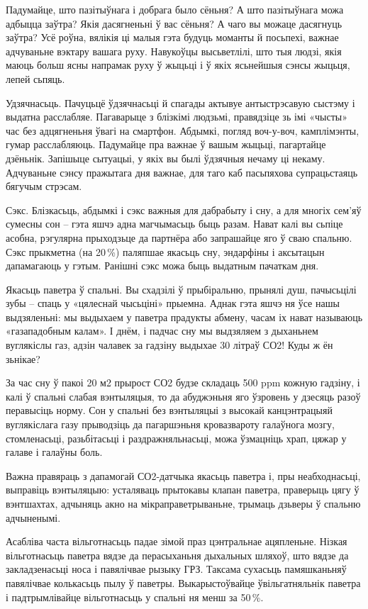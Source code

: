 Падумайце, што пазітыўнага і добрага было сёньня? А што пазітыўнага можа адбыцца заўтра? Якія дасягненьні ў вас сёньня? А чаго вы можаце дасягнуць заўтра? Усё роўна, вялікія ці малыя гэта будуць моманты й посьпехі, важнае адчуваньне вэктару вашага руху. Навукоўцы высьветлілі, што тыя людзі, якія маюць больш ясны напрамак руху ў жыцьці і ў якіх ясьнейшыя сэнсы жыцьця, лепей сьпяць.

Удзячнасьць. Пачуцьцё ўдзячнасьці й спагады актывуе антыстрэсавую сыстэму і выдатна расслабляе. Пагаварыце з блізкімі людзьмі, правядзіце зь імі «чысты» час без адцягненьня ўвагі на смартфон. Абдымкі, погляд воч-у-воч, камплімэнты, гумар расслабляюць. Падумайце пра важнае ў вашым жыцьці, пагартайце дзёньнік. Запішыце сытуацыі, у якіх вы былі ўдзячныя нечаму ці некаму. Адчуваньне сэнсу пражытага дня важнае, для таго каб пасьпяхова супрацьстаяць бягучым стрэсам.

Сэкс. Блізкасьць, абдымкі і сэкс важныя для дабрабыту і сну, а для многіх сем'яў сумесны сон – гэта яшчэ адна магчымасьць быць разам. Нават калі вы сьпіце асобна, рэгулярна прыходзьце да партнёра або запрашайце яго ў сваю спальню. Сэкс прыкметна (на 20\,\%) паляпшае якасьць сну, эндарфіны і аксытацын дапамагаюць у гэтым. Ранішні сэкс можа быць выдатным пачаткам дня.

Якасьць паветра ў спальні. Вы схадзілі ў прыбіральню, прынялі душ, пачысьцілі зубы – спаць у «цялеснай чысьціні» прыемна. Аднак гэта яшчэ ня ўсе нашы выдзяленьні: мы выдыхаем у паветра прадукты абмену, часам іх нават называюць «газападобным калам». І днём, і падчас сну мы выдзяляем з дыханьнем вуглякіслы газ, адзін чалавек за гадзіну выдыхае 30 літраў СО2! Куды ж ён зьнікае?

За час сну ў пакоі 20 м2 прырост СО2 будзе складаць 500 ppm кожную гадзіну, і калі ў спальні слабая вэнтыляцыя, то да абуджэньня яго ўзровень у дзесяць разоў перавысіць норму. Сон у спальні без вэнтыляцыі з высокай канцэнтрацыяй вуглякіслага газу прыводзіць да пагаршэньня кровазвароту галаўнога мозгу, стомленасьці, разьбітасьці і раздражняльнасьці, можа ўзмацніць храп, цяжар у галаве і галаўны боль.

Важна правяраць з дапамогай СО2-датчыка якасьць паветра і, пры неабходнасьці, выправіць вэнтыляцыю: усталяваць прытокавы клапан паветра, праверыць цягу ў вэнтшахтах, адчыняць акно на мікраправетрываньне, трымаць дзьверы ў спальню адчыненымі.

Асабліва часта вільготнасьць падае зімой праз цэнтральнае ацяпленьне. Нізкая вільготнасьць паветра вядзе да перасыханьня дыхальных шляхоў, што вядзе да закладзенасьці носа і павялічвае рызыку ГРЗ. Таксама сухасьць памяшканьняў павялічвае колькасьць пылу ў паветры. Выкарыстоўвайце ўвільгатняльнік паветра і падтрымлівайце вільготнасьць у спальні ня менш за 50\,\%.

